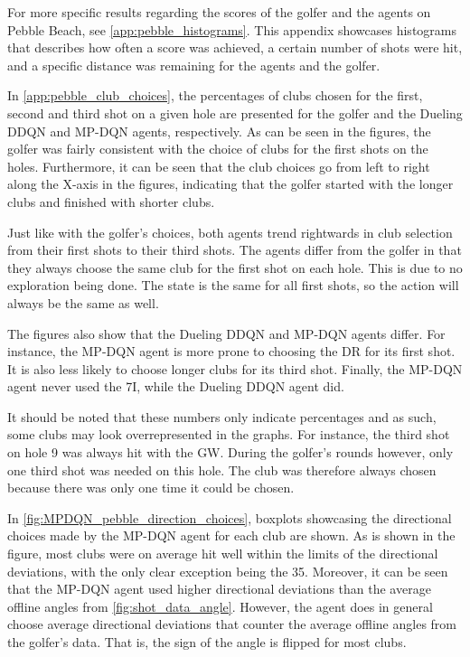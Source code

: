\documentclass{kththesis}
\begin{document}
For more specific results regarding the scores of the golfer and the agents on Pebble Beach, see \autoref{app:pebble_histograms}. This appendix showcases histograms that describes how often a score was achieved, a certain number of shots were hit, and a specific distance was remaining for the agents and the golfer.

In \autoref{app:pebble_club_choices}, the percentages of clubs chosen for the first, second and third shot on a given hole are presented for the golfer and the Dueling DDQN and MP-DQN agents, respectively. As can be seen in the figures, the golfer was fairly consistent with the choice of clubs for the first shots on the holes. Furthermore, it can be seen that the club choices go from left to right along the X-axis in the figures, indicating that the golfer started with the longer clubs and finished with shorter clubs.

Just like with the golfer's choices, both agents trend rightwards in club selection from their first shots to their third shots. The agents differ from the golfer in that they always choose the same club for the first shot on each hole. This is due to no exploration being done. The state is the same for all first shots, so the action will always be the same as well.

The figures also show that the Dueling DDQN and MP-DQN agents differ. For instance, the MP-DQN agent is more prone to choosing the DR for its first shot. It is also less likely to choose longer clubs for its third shot. Finally, the MP-DQN agent never used the 7I, while the Dueling DDQN agent did.

It should be noted that these numbers only indicate percentages and as such, some clubs may look overrepresented in the graphs. For instance, the third shot on hole 9 was always hit with the GW. During the golfer's rounds however, only one third shot was needed on this hole. The club was therefore always chosen because there was only one time it could be chosen.

In \autoref{fig:MPDQN_pebble_direction_choices}, boxplots showcasing the directional choices made by the MP-DQN agent for each club are shown. As is shown in the figure, most clubs were on average hit well within the limits of the directional deviations, with the only clear exception being the 35. Moreover, it can be seen that the MP-DQN agent used higher directional deviations than the average offline angles from \autoref{fig:shot_data_angle}. However, the agent does in general choose average directional deviations that counter the average offline angles from the golfer's data. That is, the sign of the angle is flipped for most clubs.
\end{document}
